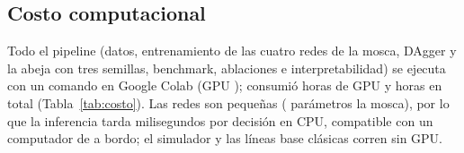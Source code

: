 \subsection{Costo computacional}
Todo el pipeline (datos, entrenamiento de las cuatro redes de la mosca, DAgger y la abeja con
tres semillas, benchmark, ablaciones e interpretabilidad) se ejecuta con un comando en Google
Colab (GPU \nfbGPU{}); consumió \nfbHorasGPU{} horas de GPU y \nfbHorasTotales{} horas en total
(Tabla~\ref{tab:costo}). Las redes son pequeñas (\nfbParamsGRU{} parámetros la mosca), por lo
que la inferencia tarda milisegundos por decisión en CPU, compatible con un computador de a
bordo; el simulador y las líneas base clásicas corren sin GPU.


